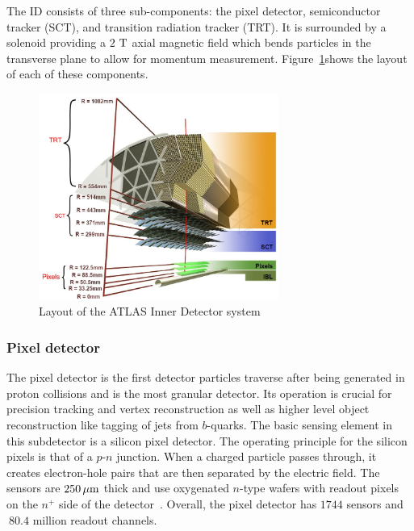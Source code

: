 The ID consists of three sub-components: the pixel detector, semiconductor tracker (SCT), and transition radiation tracker (TRT). It is surrounded by a solenoid providing a $2$ $\rm T$ axial magnetic field which bends particles in the transverse plane to allow for momentum measurement. Figure~\ref{fig:ID}shows the layout of each of these components. 

\begin{figure}[h!]
  \centering
  \captionsetup{justification=centering}

  \includegraphics[width=0.7\textwidth]{figures/ATLAS_ID}
   \caption{Layout of the ATLAS Inner Detector system~\cite{Run2Tracking}}
  \label{fig:ID}
\end{figure}

\subsubsection{Pixel detector}

The pixel detector is the first detector particles traverse after being generated in proton collisions and is the most granular detector. Its operation is crucial for precision tracking and vertex reconstruction as well as higher level object reconstruction like tagging of jets from $b$-quarks. The basic sensing element in this subdetector is a silicon pixel detector. The operating principle for the silicon pixels is that of a $p$-$n$ junction. When a charged particle passes through, it creates electron-hole pairs that are then separated by the electric field. The sensors are $250\,\mu\rm m$ thick and use oxygenated $n$-type wafers with readout pixels on the $n^+$ side of the detector~\cite{ATLASPaper}. Overall, the pixel detector has $1744$ sensors and $~80.4$ million readout channels.

